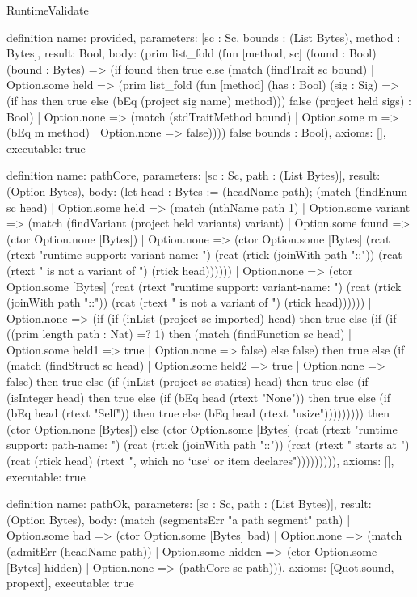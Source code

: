\begin{lexlean}{RuntimeValidate}
\begin{semanticmodule}
definition{
  name: provided,
  parameters: [sc : Sc, bounds : (List Bytes), method : Bytes],
  result: Bool,
  body: (prim list_fold (fun [method, sc] (found : Bool) (bound : Bytes) => (if found then true else (match (findTrait sc bound)
    | Option.some held => (prim list_fold (fun [method] (has : Bool) (sig : Sig) => (if has then true else (bEq (project sig name) method))) false (project held sigs) : Bool)
    | Option.none => (match (stdTraitMethod bound)
      | Option.some m => (bEq m method)
      | Option.none => false)))) false bounds : Bool),
  axioms: [],
  executable: true
}

definition{
  name: pathCore,
  parameters: [sc : Sc, path : (List Bytes)],
  result: (Option Bytes),
  body: (let head : Bytes := (headName path); (match (findEnum sc head)
    | Option.some held => (match (nthName path 1)
      | Option.some variant => (match (findVariant (project held variants) variant)
        | Option.some found => (ctor Option.none [Bytes])
        | Option.none => (ctor Option.some [Bytes] (rcat (rtext "runtime support: variant-name: ") (rcat (rtick (joinWith path "::")) (rcat (rtext " is not a variant of ") (rtick head))))))
      | Option.none => (ctor Option.some [Bytes] (rcat (rtext "runtime support: variant-name: ") (rcat (rtick (joinWith path "::")) (rcat (rtext " is not a variant of ") (rtick head))))))
    | Option.none => (if (if (inList (project sc imported) head) then true else (if (if ((prim length path : Nat) =? 1) then (match (findFunction sc head)
      | Option.some held1 => true
      | Option.none => false) else false) then true else (if (match (findStruct sc head)
      | Option.some held2 => true
      | Option.none => false) then true else (if (inList (project sc statics) head) then true else (if (isInteger head) then true else (if (bEq head (rtext "None")) then true else (if (bEq head (rtext "Self")) then true else (bEq head (rtext "usize"))))))))) then (ctor Option.none [Bytes]) else (ctor Option.some [Bytes] (rcat (rtext "runtime support: path-name: ") (rcat (rtick (joinWith path "::")) (rcat (rtext " starts at ") (rcat (rtick head) (rtext ", which no `use` or item declares"))))))))),
  axioms: [],
  executable: true
}

definition{
  name: pathOk,
  parameters: [sc : Sc, path : (List Bytes)],
  result: (Option Bytes),
  body: (match (segmentsErr "a path segment" path)
    | Option.some bad => (ctor Option.some [Bytes] bad)
    | Option.none => (match (admitErr (headName path))
      | Option.some hidden => (ctor Option.some [Bytes] hidden)
      | Option.none => (pathCore sc path))),
  axioms: [Quot.sound, propext],
  executable: true
}


\end{semanticmodule}
\end{lexlean}
